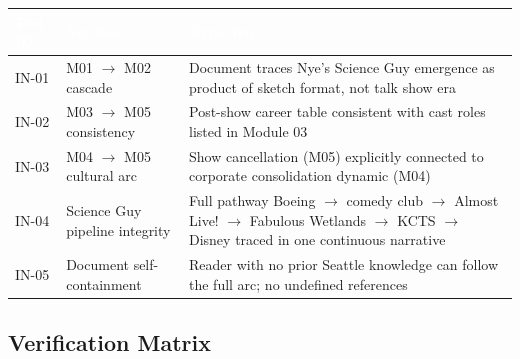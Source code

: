 \documentclass[11pt,letterpaper]{article}
\newcommand{\tableheader}[1]{\textbf{\sffamily\textcolor{white}{#1}}}
\begin{document}
\begin{center}
\begin{tabularx}{\textwidth}{C{1.5cm}L{5cm}X}
\toprule
{}
\tableheader{Test ID} & \tableheader{Verifies} & \tableheader{Expected} \\
\midrule
IN-01 & M01 $\rightarrow$ M02 cascade & Document traces Nye's Science Guy emergence as product of sketch format, not talk show era \\
IN-02 & M03 $\rightarrow$ M05 consistency & Post-show career table consistent with cast roles listed in Module 03 \\
IN-03 & M04 $\rightarrow$ M05 cultural arc & Show cancellation (M05) explicitly connected to corporate consolidation dynamic (M04) \\
IN-04 & Science Guy pipeline integrity & Full pathway Boeing $\rightarrow$ comedy club $\rightarrow$ Almost Live! $\rightarrow$ Fabulous Wetlands $\rightarrow$ KCTS $\rightarrow$ Disney traced in one continuous narrative \\
IN-05 & Document self-containment & Reader with no prior Seattle knowledge can follow the full arc; no undefined references \\
\bottomrule
\end{tabularx}
\end{center}

\subsection{Verification Matrix}
\end{document}
